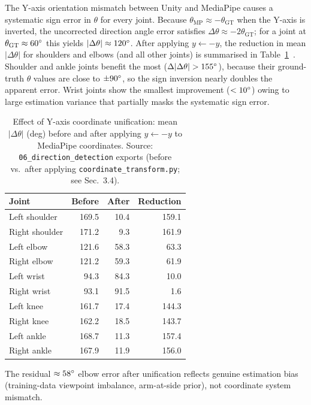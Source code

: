 \documentclass[twocolumn]{article}
\begin{document}
The Y-axis orientation mismatch between Unity and MediaPipe causes a
systematic sign error in $\theta$ for every joint. Because
$\theta_{\text{MP}} \approx -\theta_{\text{GT}}$ when the Y-axis is
inverted, the uncorrected direction angle error satisfies
$\Delta\theta \approx -2\theta_{\text{GT}}$; for a joint at
$\theta_{\text{GT}} \approx 60\degree{}$ this yields $|\Delta\theta| \approx 120\degree{}$.
After applying $y \leftarrow -y$, the reduction in mean $|\Delta\theta|$
for shoulders and elbows (and all other joints) is summarised in
Table~\ref{tab:yflip_effect}~\cite{mediapipe_coord_issue}.
Shoulder and ankle joints benefit the most ($\Delta|\Delta\theta|>155\degree{}$),
because their ground-truth $\theta$ values are close to $\pm90\degree{}$,
so the sign inversion nearly doubles the apparent error.
Wrist joints show the smallest improvement ($<10\degree{}$) owing to
large estimation variance that partially masks the systematic sign error.

\begin{table}[!t]
\centering
\caption{Effect of Y-axis coordinate unification: mean $|\Delta\theta|$ (deg)
  before and after applying $y \leftarrow -y$ to MediaPipe coordinates.
  Source: \texttt{06\_direction\_detection} exports (before vs.\ after
  applying \texttt{coordinate\_transform.py}; see Sec.~3.4).}
\label{tab:yflip_effect}
\small
\begin{tabular}{lrrr}
\toprule
Joint          & Before & After & Reduction \\
\midrule
Left shoulder  & 169.5 & 10.4 & 159.1 \\
Right shoulder & 171.2 &  9.3 & 161.9 \\
Left elbow     & 121.6 & 58.3 &  63.3 \\
Right elbow    & 121.2 & 59.3 &  61.9 \\
Left wrist     &  94.3 & 84.3 &  10.0 \\
Right wrist    &  93.1 & 91.5 &   1.6 \\
Left knee      & 161.7 & 17.4 & 144.3 \\
Right knee     & 162.2 & 18.5 & 143.7 \\
Left ankle     & 168.7 & 11.3 & 157.4 \\
Right ankle    & 167.9 & 11.9 & 156.0 \\
\bottomrule
\end{tabular}
\end{table}

The residual $\approx58\degree{}$ elbow error after unification reflects genuine
estimation bias (training-data viewpoint imbalance, arm-at-side prior),
not coordinate system mismatch.
\end{document}

